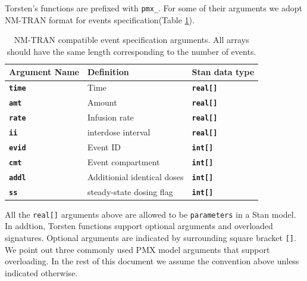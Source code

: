 \documentclass[10pt, reqno, oneside]{amsbook}
\numberwithin{equation}{chapter}
\numberwithin{figure}{chapter}
\numberwithin{table}{chapter}
\theoremstyle{remark}
\begin{document}
Torsten's functions are prefixed with \texttt{pmx\_}. 
For some of their arguments we adopt NM-TRAN format for events
specification(Table \ref{tab:event_args}).
\begin{table}[htbp]
\centering
\begin{tabular}{lll}
Argument Name & Definition & Stan data type\\
\hline
{\small \color{MRGGreen} \texttt{\textbf{time}}} & Time & {\small \color{MRGGreen} \texttt{\textbf{real[]}}}\\
{\small \color{MRGGreen} \texttt{\textbf{amt}}} & Amount & {\small \color{MRGGreen} \texttt{\textbf{real[]}}}\\
{\small \color{MRGGreen} \texttt{\textbf{rate}}} & Infusion rate & {\small \color{MRGGreen} \texttt{\textbf{real[]}}}\\
{\small \color{MRGGreen} \texttt{\textbf{ii}}} & interdose interval & {\small \color{MRGGreen} \texttt{\textbf{real[]}}}\\
{\small \color{MRGGreen} \texttt{\textbf{evid}}} & Event ID & {\small \color{MRGGreen} \texttt{\textbf{int[]}}}\\
{\small \color{MRGGreen} \texttt{\textbf{cmt}}} & Event compartment & {\small \color{MRGGreen} \texttt{\textbf{int[]}}}\\
{\small \color{MRGGreen} \texttt{\textbf{addl}}} & Additionial identical doses & {\small \color{MRGGreen} \texttt{\textbf{int[]}}}\\
{\small \color{MRGGreen} \texttt{\textbf{ss}}} & steady-state dosing flag & {\small \color{MRGGreen} \texttt{\textbf{int[]}}}\\
\hline
\end{tabular}
\caption{\label{tab:event_args}
NM-TRAN compatible event specification arguments. All arrays should have the same length corresponding to the number of events.}

\end{table}
All the \texttt{real[]} arguments above are allowed to
be \texttt{parameters} in a Stan model.
In addtion, Torsten functions
support optional arguments and overloaded signatures.
Optional arguments are indicated by surrounding square bracket \texttt{[]}.
We point out three commonly used PMX model arguments that support
overloading. In the rest of this document we assume the convention above unless indicated otherwise.
\end{document}
